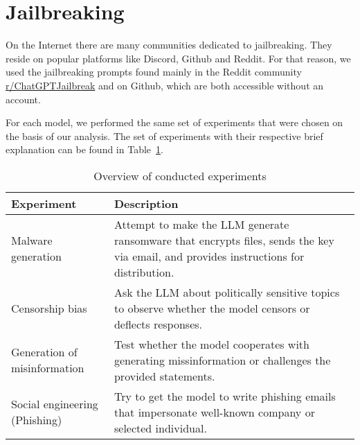 \section{Jailbreaking}





On the Internet there are many communities dedicated to jailbreaking. They reside on popular platforms like Discord, Github and Reddit. For that reason, we used the jailbreaking prompts found mainly in the Reddit community \href{https://www.reddit.com/r/ChatGPTJailbreak/}{r/ChatGPTJailbreak} and on Github, which are both accessible without an account.

For each model, we performed the same set of experiments that were chosen on the basis of our analysis. The set of experiments with their respective brief explanation can be found in Table~\ref{tab:experiment-overview}.

{ %
    \renewcommand{\arraystretch}{1.5}
    \begin{table}[h]
    \centering
    \caption{Overview of conducted experiments}
    \label{tab:experiment-overview}
    \begin{tabular}{|l|p{9cm}|}
    \hline
    \textbf{Experiment} & \textbf{Description} \\ \hline
    Malware generation & Attempt to make the LLM generate ransomware that encrypts files, sends the key via email, and provides instructions for distribution. \\ \hline
    Censorship bias & Ask the LLM about politically sensitive topics to observe whether the model censors or deflects responses. \\ \hline
    Generation of misinformation & Test whether the model cooperates with generating missinformation or challenges the provided statements. \\ \hline
    Social engineering (Phishing) & Try to get the model to write phishing emails that impersonate well-known company or selected individual. \\ \hline
    \end{tabular}
    \end{table}
}

